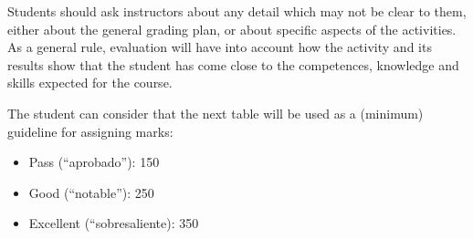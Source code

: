\documentclass[a4paper]{article}
\begin{document}
Students should ask instructors about any detail which may not be clear to them, either about the general grading plan, or about specific aspects of the activities. As a general rule, evaluation will have into account how the activity and its results show that the student has come close to the competences, knowledge and skills expected for the course.

The student can consider that the next table will be used as a (minimum) guideline for assigning marks:

\begin{itemize}
\item Pass (``aprobado''): 150
\item Good (``notable''): 250
\item Excellent (``sobresaliente): 350
\end{itemize}
\end{document}
